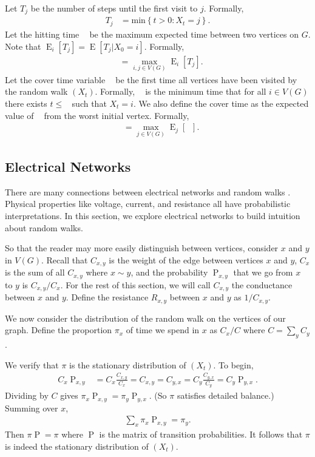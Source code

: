 \documentclass[12pt]{article}
\theoremstyle{definition}
\DeclareMathOperator{\E}{\mathrm{E}}		     %
\DeclareMathOperator{\pr}{\mathrm{P}}		     %
\DeclareMathOperator{\cov}{\uptau_\textrm{cov}}  %
\DeclareMathOperator{\tcov}{t_\textrm{cov}}      %
\DeclareMathOperator{\hit}{t_{\textrm{hit}}}     %
\begin{document}
Let $T_{j}$ be the number of steps until the first visit to $j$.
Formally,
\begin{align}
T_{j} &= \textrm{min} \left\{t > 0 : X_t = j \right\}. \nonumber
\end{align}
Let the hitting time $\hit$ be the maximum expected time between two vertices on $G$.
Note that $\E_i[T_j] = \E[T_j | X_0 = i]$.
Formally, 
\begin{align}
\hit &= \max_{i,j \in V(G)} \E_i[T_j]. \nonumber
\end{align}
Let the cover time variable $\cov$ be the first time all vertices have been
visited by the random walk $(X_t)$.
Formally, $\cov$ is the minimum time that for all $i \in V(G)$
there exists $t \leq \cov$ such that $X_t = i$.
We also define the cover time as the expected value of $\cov$ from
the worst initial vertex.
Formally,
\begin{align}
\tcov &= \max_{j \in V(G)} \E_j[\cov] . \nonumber
\end{align}

\subsection{Electrical Networks \label{sec:electric}}

There are many connections between electrical networks
and random walks \cite{DS84}.
Physical properties like voltage, current, and resistance
all have probabilistic interpretations.
In this section, we explore electrical networks to build intuition about 
random walks.

So that the reader may more easily distinguish between
vertices, consider $x$ and $y$ in $V(G)$.
Recall that $C_{x,y}$ is the weight of the edge
between vertices $x$ and $y$, $C_x$ is the sum
of all $C_{x,y}$ where $x \sim y$, and the probability $\pr_{x,y}$
that we go from $x$ to $y$ is $C_{x,y}/C_x$.
For the rest of this section, we will call $C_{x,y}$
the conductance between $x$ and $y$.
Define the resistance $R_{x,y}$ between $x$ and $y$
as $1/ C_{x,y}$.

We now consider the distribution of the random
walk on the vertices of our graph.
Define the proportion $\pi_x$ of time we spend in $x$
as $C_x/C$ where $C=\sum_y C_y$.

We verify that $\pi$ is the stationary distribution
of $(X_t)$.
To begin,
\begin{align}
C_x \pr_{x,y} &= C_x \frac{C_{x,y}}{C_x} = C_{x,y} = C_{y,x} 
= C_y \frac{C_{y,x}}{C_y} = C_y \pr_{y,x}. \nonumber
\end{align}
Dividing by $C$ gives $\pi_x \pr_{x,y} = \pi_y \pr_{y,x}$.
(So $\pi$ satisfies detailed balance.)
Summing over $x$,
\begin{align}
\sum_x \pi_x \pr_{x,y} = \pi_y . \nonumber
\end{align}
Then $\pi \pr = \pi$ where $\pr$ is the matrix of transition probabilities.
It follows that $\pi$ is indeed the stationary distribution of $(X_t)$.
\end{document}
